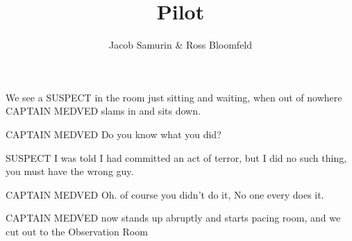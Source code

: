 \documentclass{screenplay}[2012/06/30]
\title{Pilot}
\author{Jacob Samurin \& Ross Bloomfeld}
\begin{document}
\coverpage
\fadein
{}

We see a SUSPECT in the room just sitting and waiting, when out of nowhere CAPTAIN MEDVED slams in and sits down.

\begin{dialogue}{CAPTAIN MEDVED}
	Do you know what you did?
\end{dialogue}

\begin{dialogue}{SUSPECT}
	I was told I had committed an act of terror, but I did no such thing, you must have the wrong guy.
\end{dialogue}

\begin{dialogue}[Sarcastically]{CAPTAIN MEDVED}
	Oh. of course you didn't do it, No one every does it.
\end{dialogue}

CAPTAIN MEDVED now stands up abruptly and starts pacing room, and we cut out to the Observation Room









\end{document}

